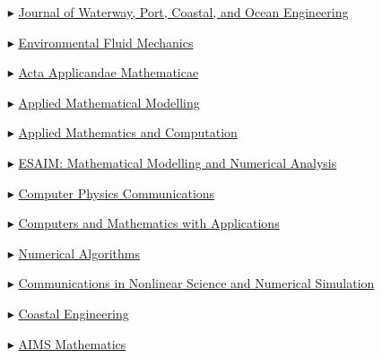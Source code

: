 \begin{itemize}
    \item[$\blacktriangleright$] \href{http://ascelibrary.org/wwo/}%
    {Journal of Waterway, Port, Coastal, and Ocean Engineering}

    \item[$\blacktriangleright$] \href{https://link.springer.com/journal/10652/}%
    {Environmental Fluid Mechanics}

    \item[$\blacktriangleright$] \href{https://link.springer.com/journal/10440/}%
    {Acta Applicandae Mathematicae}
    
    \item[$\blacktriangleright$] \href{http://www.journals.elsevier.com/applied-mathematical-modelling/}%
    {Applied Mathematical Modelling}
    
    \item[$\blacktriangleright$] \href{http://www.journals.elsevier.com/applied-mathematics-and-computation/}%
    {Applied Mathematics and Computation}

    \item[$\blacktriangleright$] \href{https://www.esaim-m2an.org/}%
   {ESAIM: Mathematical Modelling and Numerical Analysis}
    
    \item[$\blacktriangleright$] \href{https://www.journals.elsevier.com/computer-physics-communications}{Computer Physics Communications}
    
    \item[$\blacktriangleright$] \href{http://www.journals.elsevier.com/computers-and-mathematics-with-applications/}%
    {Computers and Mathematics with Applications}
    
    \item[$\blacktriangleright$] \href{http://www.springerlink.com/content/101751/}{Numerical Algorithms}
    
    \item[$\blacktriangleright$] \href{http://www.journals.elsevier.com/communications-in-nonlinear-science-and-numerical-simulation}%
    {Communications in Nonlinear Science and Numerical Simulation}

    \item[$\blacktriangleright$] \href{https://www.sciencedirect.com/journal/coastal-engineering/}{Coastal Engineering}

    \item[$\blacktriangleright$] \href{https://www.aimspress.com/journal/Math/}{AIMS Mathematics}
   

\end{itemize}
